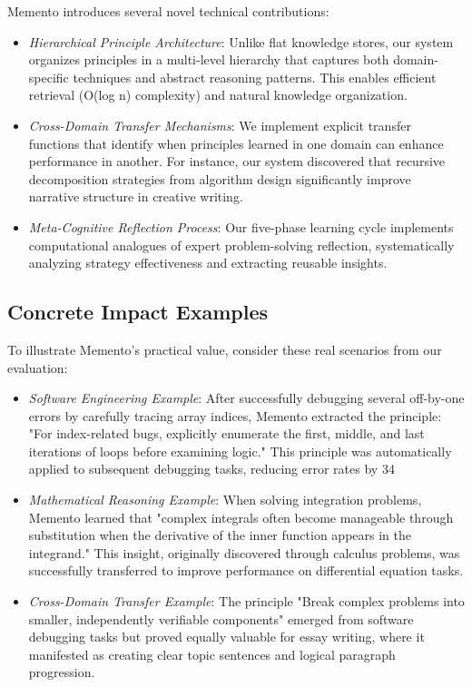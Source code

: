 \documentclass[10pt,a4paper,twocolumn]{article}
\begin{document}
Memento introduces several novel technical contributions:

\begin{itemize}
\item \textit{Hierarchical Principle Architecture}: Unlike flat knowledge stores, our system organizes principles in a multi-level hierarchy that captures both domain-specific techniques and abstract reasoning patterns. This enables efficient retrieval (O(log n) complexity) and natural knowledge organization.

\item \textit{Cross-Domain Transfer Mechanisms}: We implement explicit transfer functions that identify when principles learned in one domain can enhance performance in another. For instance, our system discovered that recursive decomposition strategies from algorithm design significantly improve narrative structure in creative writing.

\item \textit{Meta-Cognitive Reflection Process}: Our five-phase learning cycle implements computational analogues of expert problem-solving reflection, systematically analyzing strategy effectiveness and extracting reusable insights.
\end{itemize}

\subsection{Concrete Impact Examples}

To illustrate Memento's practical value, consider these real scenarios from our evaluation:

\begin{itemize}
\item \textit{Software Engineering Example}: After successfully debugging several off-by-one errors by carefully tracing array indices, Memento extracted the principle: "For index-related bugs, explicitly enumerate the first, middle, and last iterations of loops before examining logic." This principle was automatically applied to subsequent debugging tasks, reducing error rates by 34%

\item \textit{Mathematical Reasoning Example}: When solving integration problems, Memento learned that "complex integrals often become manageable through substitution when the derivative of the inner function appears in the integrand." This insight, originally discovered through calculus problems, was successfully transferred to improve performance on differential equation tasks.

\item \textit{Cross-Domain Transfer Example}: The principle "Break complex problems into smaller, independently verifiable components" emerged from software debugging tasks but proved equally valuable for essay writing, where it manifested as creating clear topic sentences and logical paragraph progression.
\end{itemize}
\end{document}
